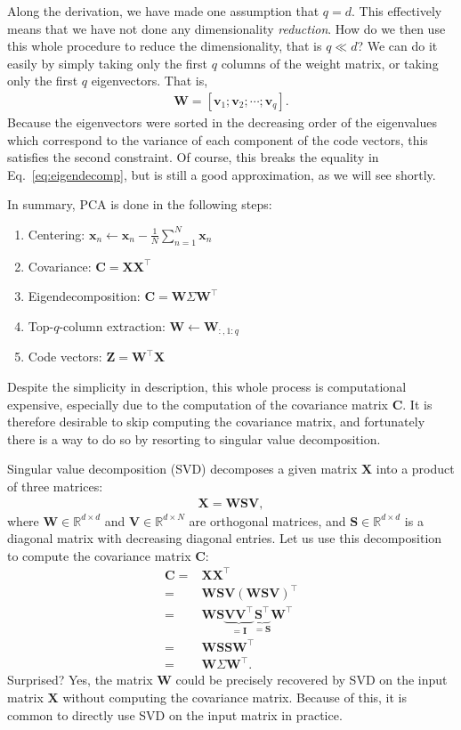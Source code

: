 \documentclass{report}
\newcommand{\vect}[1]{\mathbf{#1}}
\newcommand{\matr}[1]{\mathbf{#1}}
\newcommand{\vv}[0]{\vect{v}}
\newcommand{\vx}[0]{\vect{x}}
\newcommand{\mW}[0]{\matr{W}}
\newcommand{\mZ}[0]{\matr{Z}}
\newcommand{\mX}[0]{\matr{X}}
\newcommand{\mV}[0]{\matr{V}}
\newcommand{\mC}{\matr{C}}
\newcommand{\mS}{\matr{S}}
\newcommand{\mI}{\matr{I}}
\newcommand{\RR}[0]{\mathbb{R}}
\begin{document}
Along the derivation, we have made one assumption that $q=d$. This effectively
means that we have not done any dimensionality {\it reduction}. How do we then
use this whole procedure to reduce the dimensionality, that is $q \ll d$? We can
do it easily by simply taking only the first $q$ columns of the weight matrix, or
taking only the first $q$ eigenvectors. That is,
\begin{align*}
    \mW = \left[
        \vv_1; \vv_2; \cdots; \vv_q
    \right].
\end{align*}
Because the eigenvectors were sorted in the decreasing order of the
eigenvalues which correspond to the variance of each component of the code
vectors, this satisfies the second constraint. Of course, this breaks the
equality in Eq.~\eqref{eq:eigendecomp}, but is still a good approximation, as we
will see shortly.

In summary, PCA is done in the following steps:
\begin{enumerate}
    \item Centering: $\vx_n \leftarrow \vx_n - \frac{1}{N}\sum_{n=1}^N \vx_n$
    \item Covariance: $\mC = \mX \mX^\top$
    \item Eigendecomposition: $\mC = \mW \Sigma \mW^\top$
    \item Top-$q$-column extraction: $\mW \leftarrow \mW_{:,1:q}$
    \item Code vectors: $\mZ = \mW^\top \mX$
\end{enumerate}
Despite the simplicity in description, this whole process is computational
expensive, especially due to the computation of the covariance matrix $\mC$.  It
is therefore desirable to skip computing the covariance matrix, and fortunately
there is a way to do so by resorting to singular value decomposition.

Singular value decomposition (SVD) decomposes a given matrix $\mX$ into a
product of three matrices:
\begin{align}
    \label{eq:svd}
    \mX = \mW \mS \mV,
\end{align}
where $\mW \in \RR^{d \times d}$ and $\mV \in \RR^{d \times N}$ are orthogonal
matrices, and $\mS \in \RR^{d \times d}$ is a diagonal matrix with
decreasing diagonal entries. Let us use this decomposition to compute the
covariance matrix $\mC$:
\begin{align*}
    \mC =& \mX \mX^\top \\
    =& \mW \mS \mV (\mW \mS \mV)^\top \\
    =& \mW \mS \underbrace{\mV \mV^\top}_{=\mI} \underbrace{\mS^\top}_{=\mS} \mW^\top \\
    =& \mW \mS \mS \mW^\top \\
    =& \mW \Sigma \mW^\top.
\end{align*}
Surprised? Yes, the matrix $\mW$ could be precisely recovered by SVD on the
input matrix $\mX$ without computing the covariance matrix. Because of this, it
is common to directly use SVD on the input matrix in practice.
\end{document}
